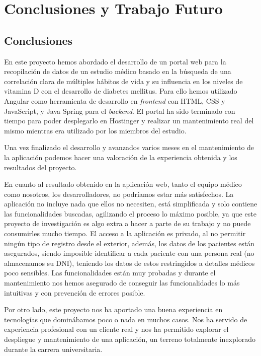 \chapter{Conclusiones y Trabajo Futuro}
    \section{Conclusiones}
    En este proyecto hemos abordado el desarrollo de un portal web para la recopilación de datos de un estudio médico basado en la búsqueda de una correlación clara de múltiples hábitos de vida y su influencia en los niveles de vitamina D con el desarrollo de diabetes mellitus. Para ello hemos utilizado Angular como herramienta de desarrollo en \textit{frontend} con HTML, CSS y JavaScript, y Java Spring para el \textit{backend}. El portal ha sido terminado con tiempo para poder desplegarlo en Hostinger y realizar un mantenimiento real del mismo mientras era utilizado por los miembros del estudio. \newline
    
    Una vez finalizado el desarrollo y avanzados varios meses en el mantenimiento de la aplicación podemos hacer una valoración de la experiencia obtenida y los resultados del proyecto.
    \newline
    
    En cuanto al resultado obtenido en la aplicación web, tanto el equipo médico como nosotros, los desarrolladores, no podríamos estar más satisfechos. La aplicación no incluye nada que ellos no necesiten, está simplificada y solo contiene las funcionalidades buscadas, agilizando el proceso lo máximo posible, ya que este proyecto de investigación es algo extra a hacer a parte de su trabajo y no puede consumirles mucho tiempo.   El acceso a la aplicación es privado, al no permitir ningún tipo de registro desde el exterior, además, los datos de los pacientes están asegurados, siendo imposible identificar a cada paciente con una persona real (no almacenamos su DNI), teniendo los datos de estos restringidos a detalles médicos poco sensibles. Las funcionalidades están muy probadas y durante el mantenimiento nos hemos asegurado de conseguir las funcionalidades lo más intuitivas y con prevención de errores posible.
    \newline
    
    Por otro lado, este proyecto nos ha aportado una buena experiencia en tecnologías que dominábamos poco o nada en muchos casos. Nos ha servido de experiencia profesional con un cliente real y nos ha permitido explorar el despliegue y mantenimiento de una aplicación, un terreno totalmente inexplorado durante la carrera universitaria.
    \newline
    

